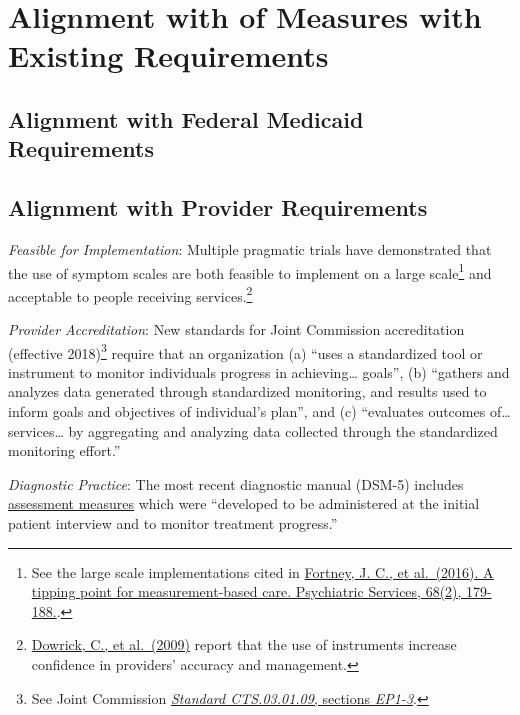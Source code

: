 \documentclass[
]{book}
\begin{document}
\hypertarget{alignment-with-of-measures-with-existing-requirements}{%
\section{Alignment with of Measures with Existing Requirements}\label{alignment-with-of-measures-with-existing-requirements}}

\hypertarget{alignment-with-federal-medicaid-requirements}{%
\subsection{Alignment with Federal Medicaid Requirements}\label{alignment-with-federal-medicaid-requirements}}

\hypertarget{alignment-with-provider-requirements}{%
\subsection{Alignment with Provider Requirements}\label{alignment-with-provider-requirements}}

\emph{Feasible for Implementation}: Multiple pragmatic trials have demonstrated that the use of symptom scales are both feasible to implement on a large scale\footnote{See the large scale implementations cited in \href{https://ps.psychiatryonline.org/doi/full/10.1176/appi.ps.201500439\#T1}{Fortney, J. C., et al.~(2016). A tipping point for measurement-based care. Psychiatric Services, 68(2), 179-188.}.} and acceptable to people receiving services.\footnote{\href{https://www.bmj.com/content/338/bmj.b663.long}{Dowrick, C., et al.~(2009)} report that the use of instruments increase confidence in providers' accuracy and management.}

\emph{Provider Accreditation}: New standards for Joint Commission accreditation (effective 2018)\footnote{See Joint Commission \href{https://www.jointcommission.org/assets/1/6/Approved_BHC_outcome_meas_2018.pdf}{\emph{Standard CTS.03.01.09}, sections \emph{EP1-3}}.} require that an organization (a) ``uses a standardized tool or instrument to monitor individuals progress in achieving\ldots{} goals'', (b) ``gathers and analyzes data generated through standardized monitoring, and results used to inform goals and objectives of individual's plan'', and (c) ``evaluates outcomes of\ldots{} services\ldots{} by aggregating and analyzing data collected through the standardized monitoring effort.''

\emph{Diagnostic Practice}: The most recent diagnostic manual (DSM-5) includes \href{https://www.psychiatry.org/psychiatrists/practice/dsm/educational-resources/assessment-measures}{assessment measures} which were ``developed to be administered at the initial patient interview and to monitor treatment progress.''
\end{document}
